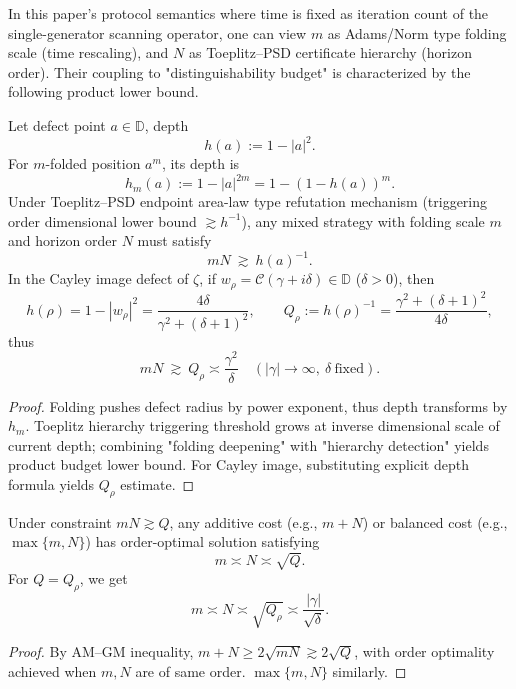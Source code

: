 In this paper's protocol semantics where time is fixed as iteration count of the single-generator scanning operator, one can view \(m\) as Adams/Norm type folding scale (time rescaling), and \(N\) as Toeplitz--PSD certificate hierarchy (horizon order).
Their coupling to "distinguishability budget" is characterized by the following product lower bound.

\begin{theorem}\label{thm:xi-time-horizon-product-lower-bound}
Let defect point \(a\in\mathbb D\), depth
\[
h(a):=1-|a|^2.
\]
For \(m\)-folded position \(a^m\), its depth is
\[
h_m(a):=1-|a|^{2m}=1-(1-h(a))^m.
\]
Under Toeplitz--PSD endpoint area-law type refutation mechanism (triggering order dimensional lower bound \(\gtrsim h^{-1}\)), any mixed strategy with folding scale \(m\) and horizon order \(N\) must satisfy
\[
mN\ \gtrsim\ h(a)^{-1}.
\]
In the Cayley image defect of \(\zeta\), if
\(
w_\rho=\mathcal C(\gamma+i\delta)\in\mathbb D
\)
(\(\delta>0\)), then
\[
h(\rho)=1-|w_\rho|^2
=\frac{4\delta}{\gamma^2+(\delta+1)^2},
\qquad
Q_\rho:=h(\rho)^{-1}
=\frac{\gamma^2+(\delta+1)^2}{4\delta},
\]
thus
\[
mN\ \gtrsim\ Q_\rho\asymp \frac{\gamma^2}{\delta}\quad(|\gamma|\to\infty,\ \delta\ \text{fixed}).
\]
\end{theorem}

\begin{proof}
Folding pushes defect radius by power exponent, thus depth transforms by \(h_m\).
Toeplitz hierarchy triggering threshold grows at inverse dimensional scale of current depth;
combining "folding deepening" with "hierarchy detection" yields product budget lower bound.
For Cayley image, substituting explicit depth formula yields \(Q_\rho\) estimate.
\end{proof}

\begin{proposition}\label{prop:xi-optimal-allocation-under-product-bound}
Under constraint
\(
mN\gtrsim Q
\),
any additive cost (e.g., \(m+N\)) or balanced cost (e.g., \(\max\{m,N\}\)) has order-optimal solution satisfying
\[
m\asymp N\asymp \sqrt Q.
\]
For \(Q=Q_\rho\), we get
\[
m\asymp N\asymp \sqrt{Q_\rho}\asymp \frac{|\gamma|}{\sqrt\delta}.
\]
\end{proposition}

\begin{proof}
By AM--GM inequality,
\(
m+N\ge 2\sqrt{mN}\gtrsim 2\sqrt Q
\),
with order optimality achieved when \(m,N\) are of same order.
\(\max\{m,N\}\) similarly.
\end{proof}

